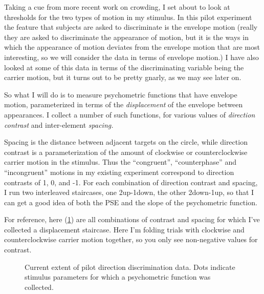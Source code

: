 \documentclass[english,noae]{article}
\begin{document}
Taking a cue from more recent work on crowding, I set about to look
at thresholds for the two types of motion in my stimulus. In this
pilot experiment the feature that subjects are asked to discriminate
is the envelope motion (really they are asked to discriminate the
appearance of motion, but it is the ways in which the appearance of
motion deviates from the envelope motion that are most interesting,
so we will consider the data in terms of envelope motion.) I have
also looked at some of this data in terms of the discriminating variable
being the carrier motion, but it turns out to be pretty gnarly, as
we may see later on.

So what I will do is to measure psychometric functions that have envelope
motion, parameterized in terms of the \emph{displacement} of the envelope
between appearances. I collect a number of such functions, for various
values of \emph{direction contrast} and\emph{ }inter-element\emph{
spacing.}

Spacing is the distance between adjacent targets on the circle, while
direction contrast is a parameterization of the amount of clockwise
or counterclockwise carrier motion in the stimulus. Thus the ``congruent'',
``counterphase'' and ``incongruent'' motions in my existing experiment
correspond to direction contrasts of 1, 0, and -1. For each combination
of direction contrast and spacing, I run two interleaved staircases,
one 2up-1down, the other 2down-1up, so that I can get a good idea
of both the PSE and the slope of the psychometric function.





For reference, here (\ref{fig:data-extent}) are all combinations
of contrast and spacing for which I've collected a displacement staircase.
Here I'm folding trials with clockwise and counterclockwise carrier
motion together, so you only see non-negative values for contrast.

\begin{figure}[h]





\caption{\label{fig:data-extent}Current extent of pilot direction discrimination
data. Dots indicate stimulus parameters for which a psychometric function
was collected.}
\end{figure}
\end{document}
